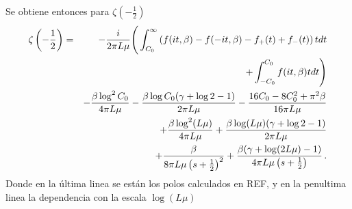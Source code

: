 Se obtiene entonces para $\zeta \left( - \frac{1}{2} \right)$
\begin{eqnarray}
\zeta \left( - \frac{1}{2} \right) &=& 
- \frac{i}{2 \pi L \mu} 
\Bigg(	  
		 \int _{C _0} ^{\infty}
			\left(
					f (i t,\beta )
					- f (-i t,\beta )
					- f _{+} (t) 
					+ f _{-} (t)
					\right)
			t   dt   \nonumber
\\ \nonumber
&&\hskip 1.5cm +
		 \int _{- C _0} ^{C _0}
			f (i t,\beta )
			t   dt 	
	\Bigg)
\\ \nonumber
&&
	- \frac{\beta \log ^2 C _0}{4 \pi L \mu}
	- \frac{\beta \log C _0 (\gamma + \log 2 -1 )}{2 \pi L \mu} 
	- \frac{16 C_0 - 8 C _0 ^2 + \pi ^2 \beta}{16 \pi L \mu}
\\ \nonumber
&&
	+\frac{\beta \log ^2 (L \mu )}{4 \pi L \mu} 
	+ \frac{\beta \log  (L \mu) (\gamma + \log 2 -1)}{2 \pi L \mu}
\\ 
&&	+ \frac{\beta}
		 {8 \pi L \mu  \left( s + \frac{1}{2} \right) ^2} +
	\frac{\beta (\gamma + \log (2 L \mu) -1 ) }
		 {4 \pi L \mu  \left( s + \frac{1}{2} 														 \right)} 
\, .
\end{eqnarray}
Donde en la última linea se están los polos calculados en REF, y en la penultima linea la dependencia con la escala $\log (L \mu)$













